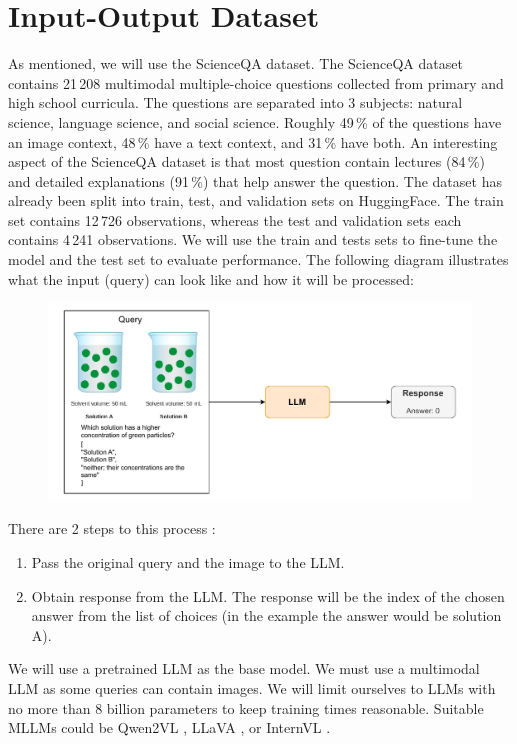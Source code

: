\documentclass[11pt]{article} %
\begin{document}
\section*{Input-Output Dataset}

As mentioned, we will use the ScienceQA dataset. The ScienceQA dataset contains 21\,208 multimodal multiple-choice questions collected from primary and high school curricula. The questions are separated into 3 subjects: natural science, language science, and social science. Roughly 49\,\% of the questions have an image context, 48\,\% have a text context, and 31\,\% have both. An interesting aspect of the ScienceQA dataset is that most question contain lectures (84\,\%) and detailed explanations (91\,\%) that help answer the question. The dataset has already been split into train, test, and validation sets on HuggingFace. The train set contains 12\,726 observations, whereas the test and validation sets each contains 4\,241 observations. We will use the train and tests sets to fine-tune the model and the test set to evaluate performance. The following diagram illustrates what the input (query) can look like and how it will be processed: 

\begin{figure}[H]
    \centering
    \includegraphics[width=\linewidth]{llm_diagram.pdf}
\end{figure}

There are 2 steps to this process :
\begin{enumerate}
    \item Pass the original query and the image to the LLM.
    \item Obtain response from the LLM. The response will be the index of the chosen answer from the list of choices (in the example the answer would be solution A).
\end{enumerate}

We will use a pretrained LLM as the base model. We must use a multimodal LLM as some queries can contain images. We will limit ourselves to LLMs with no more than 8 billion parameters to keep training times reasonable. Suitable MLLMs could be Qwen2VL \cite{Qwen2VL}, LLaVA \cite{liu2023llava}, or InternVL \cite{chen2023internvl}. 
\end{document}
